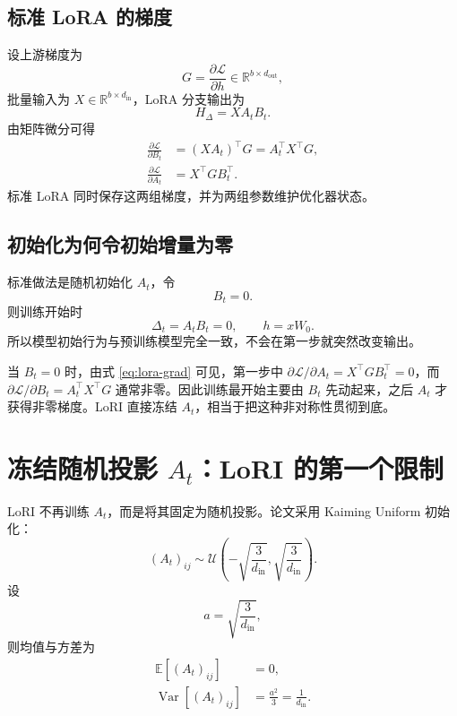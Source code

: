 \documentclass[UTF8,12pt,a4paper,fontset=none]{ctexart}
\numberwithin{equation}{section}
\newcommand{\R}{\mathbb{R}}
\newcommand{\E}{\mathbb{E}}
\newcommand{\Loss}{\mathcal{L}}
\begin{document}
\subsection{标准 LoRA 的梯度}

设上游梯度为
\begin{equation}
  G=\frac{\partial\Loss}{\partial h}
  \in\R^{b\times d_{\mathrm{out}}},
\end{equation}
批量输入为 $X\in\R^{b\times d_{\mathrm{in}}}$，LoRA 分支输出为
\begin{equation}
  H_{\Delta}=XA_tB_t.
\end{equation}
由矩阵微分可得
\begin{align}
  \frac{\partial\Loss}{\partial B_t}
  &=(XA_t)^{\top}G
  =A_t^{\top}X^{\top}G,\\
  \frac{\partial\Loss}{\partial A_t}
  &=X^{\top}GB_t^{\top}.
  \label{eq:lora-grad}
\end{align}
标准 LoRA 同时保存这两组梯度，并为两组参数维护优化器状态。

\subsection{初始化为何令初始增量为零}

标准做法是随机初始化 $A_t$，令
\begin{equation}
  B_t=0.
\end{equation}
则训练开始时
\begin{equation}
  \Delta_t=A_tB_t=0,
  \qquad
  h=xW_0.
\end{equation}
所以模型初始行为与预训练模型完全一致，不会在第一步就突然改变输出。

\begin{notebox}[一个常被忽略的梯度现象]
当 $B_t=0$ 时，由式 \eqref{eq:lora-grad} 可见，第一步中 $\partial\Loss/\partial A_t=X^{\top}GB_t^{\top}=0$，而 $\partial\Loss/\partial B_t=A_t^{\top}X^{\top}G$ 通常非零。因此训练最开始主要由 $B_t$ 先动起来，之后 $A_t$ 才获得非零梯度。LoRI 直接冻结 $A_t$，相当于把这种非对称性贯彻到底。
\end{notebox}

\section{冻结随机投影 \texorpdfstring{$A_t$}{A t}：LoRI 的第一个限制}

LoRI 不再训练 $A_t$，而是将其固定为随机投影。论文采用 Kaiming Uniform 初始化：
\begin{equation}
  (A_t)_{ij}\sim
  \mathcal{U}\left(-\sqrt{\frac{3}{d_{\mathrm{in}}}},
  \sqrt{\frac{3}{d_{\mathrm{in}}}}\right).
  \label{eq:kaiming}
\end{equation}
设
\begin{equation}
  a=\sqrt{\frac{3}{d_{\mathrm{in}}}},
\end{equation}
则均值与方差为
\begin{align}
  \E[(A_t)_{ij}]&=0,\\
  \operatorname{Var}[(A_t)_{ij}]
  &=\frac{a^2}{3}
  =\frac{1}{d_{\mathrm{in}}}.
\end{align}
\end{document}
